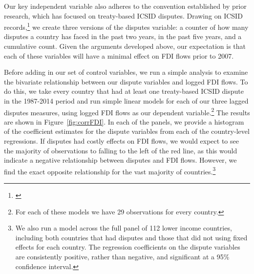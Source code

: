 \documentclass[12pt,onesided]{amsart}
\begin{document}
\nocite{icsid:2014}
Our key independent variable also adheres to the convention established by prior research, which has focused on treaty-based ICSID disputes. Drawing on ICSID records,\footnote{\citet[p. 7, 10]{icsid:2015}} we create three versions of the disputes variable: a counter of how many disputes a country has faced in the past two years, in the past five years, and a cumulative count. Given the arguments developed above, our expectation is that each of these variables will have a minimal effect on FDI flows prior to 2007.


Before adding in our set of control variables, we run a simple analysis to examine the bivariate relationship between our dispute variables and logged FDI flows. To do this, we take every country that had at least one treaty-based ICSID dispute in the 1987-2014 period and run simple linear models for each of our three lagged disputes measures, using logged FDI flows as our dependent variable.\footnote{For each of these models we have 29 observations for every country.} The results are shown in Figure~\ref{fig:corrFDI}. In each of the panels, we provide a histogram of the coefficient estimates for the dispute variables from each of the country-level regressions. If disputes had costly effects on FDI flows, we would expect to see the majority of observations to falling to the left of the red line, as this would indicate a negative relationship between disputes and FDI flows. However, we find the exact opposite relationship for the vast majority of countries.\footnote{We also run a model across the full panel of 112 lower income countries, including both countries that had disputes and those that did not using fixed effects for each country. The regression coefficients on the dispute variables are consistently positive, rather than negative, and significant at a 95\% confidence interval.}
\end{document}
